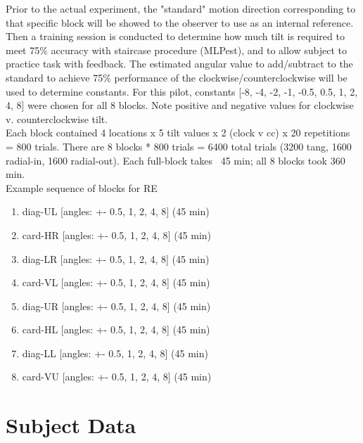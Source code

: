 \documentclass[11pt]{article} %
\begin{document}
Prior to the actual experiment, the "standard" motion direction corresponding to that specific block will be showed to the observer to use as an internal reference. Then a training session is conducted to determine how much tilt is required to meet 75\% accuracy with staircase procedure (MLPest), and to allow subject to practice task with feedback. The estimated angular value to add/subtract to the standard to achieve 75\% performance of the clockwise/counterclockwise will be used to determine constants. For this pilot, constants [-8, -4, -2, -1, -0.5, 0.5, 1, 2, 4, 8] were chosen for all 8 blocks. Note positive and negative values for clockwise v. counterclockwise tilt.
\\
Each block contained 4 locations x 5 tilt values x 2 (clock v cc) x 20 repetitions = 800 trials. There are 8 blocks * 800 trials = 6400 total trials (3200 tang, 1600 radial-in, 1600 radial-out). Each full-block takes ~45 min; all 8 blocks took 360 min. 
\\
Example sequence of blocks for RE
\begin{enumerate}
\item diag-UL [angles: +- 0.5, 1, 2, 4, 8] (45 min)
\item card-HR [angles: +- 0.5, 1, 2, 4, 8] (45 min)
\item diag-LR [angles: +- 0.5, 1, 2, 4, 8] (45 min)
\item card-VL [angles: +- 0.5, 1, 2, 4, 8] (45 min)
\item diag-UR [angles: +- 0.5, 1, 2, 4, 8] (45 min)
\item card-HL [angles: +- 0.5, 1, 2, 4, 8] (45 min)
\item diag-LL [angles: +- 0.5, 1, 2, 4, 8] (45 min)
\item card-VU [angles: +- 0.5, 1, 2, 4, 8] (45 min)
\end{enumerate}

\newpage
\section{Subject Data}
\end{document}
